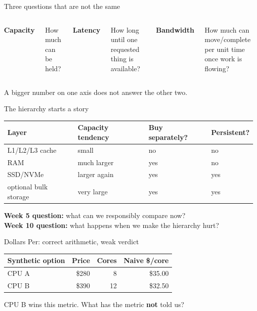 \documentclass{beamer}
\begin{document}
\begin{frame}{Three questions that are not the same}
\begin{columns}[T]
\textbf{Capacity}

How much can be held?

\textbf{Latency}

How long until one requested thing is available?

\textbf{Bandwidth}

How much can move/complete per unit time once work is flowing?
\end{columns}

\vspace{1.4em}
\centering
A bigger number on one axis does not answer the other two.
\end{frame}

\begin{frame}{The hierarchy starts a story}
\small
\begin{tabular}{llll}
\toprule
Layer & Capacity tendency & Buy separately? & Persistent? \\
\midrule
L1/L2/L3 cache & small & no & no \\
RAM & much larger & yes & no \\
SSD/NVMe & larger again & yes & yes \\
optional bulk storage & very large & yes & yes \\
\bottomrule
\end{tabular}

\vspace{1em}
\textbf{Week 5 question:} what can we responsibly compare now?\\
\textbf{Week 10 question:} what happens when we make the hierarchy hurt?
\end{frame}

\begin{frame}{Dollars Per: correct arithmetic, weak verdict}
\begin{center}
\begin{tabular}{lrrr}
\toprule
Synthetic option & Price & Cores & Naive \$/core \\
\midrule
CPU A & \$280 & 8 & \$35.00 \\
CPU B & \$390 & 12 & \$32.50 \\
\bottomrule
\end{tabular}
\end{center}

CPU B wins this metric. What has the metric \textbf{not} told us?
\end{frame}
\end{document}
